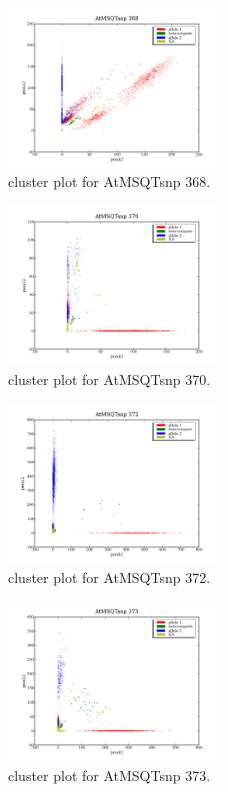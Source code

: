 \begin{figure}[H]
\includegraphics[width=0.5\textwidth]{figures/cluster_plot_AtMSQTsnp_368.png}
\caption{cluster plot for AtMSQTsnp 368.} \label{flAtMSQTsnp368}
\end{figure}
\begin{figure}[H]
\includegraphics[width=0.5\textwidth]{figures/cluster_plot_AtMSQTsnp_370.png}
\caption{cluster plot for AtMSQTsnp 370.} \label{flAtMSQTsnp370}
\end{figure}
\begin{figure}[H]
\includegraphics[width=0.5\textwidth]{figures/cluster_plot_AtMSQTsnp_372.png}
\caption{cluster plot for AtMSQTsnp 372.} \label{flAtMSQTsnp372}
\end{figure}
\begin{figure}[H]
\includegraphics[width=0.5\textwidth]{figures/cluster_plot_AtMSQTsnp_373.png}
\caption{cluster plot for AtMSQTsnp 373.} \label{flAtMSQTsnp373}
\end{figure}
